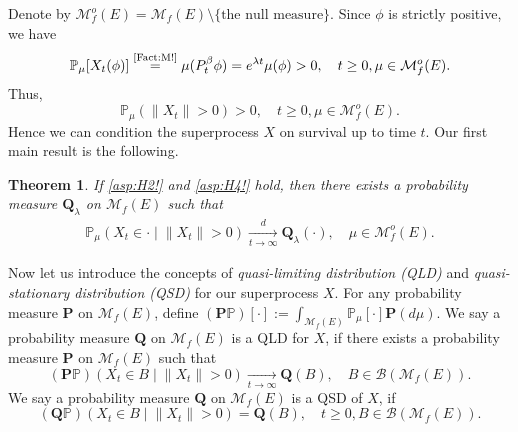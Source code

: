 \documentclass[12pt,a4paper]{amsart}
\numberwithin{equation}{section}
\theoremstyle{plain}
\newtheorem{thm}{Theorem}[section]
\theoremstyle{definition}
\theoremstyle{remark}
\begin{document}
	Denote by $\mathcal M_f^o(E) = \mathcal M_f(E)\setminus \{ \text{the null measure}\}$.
	Since $\phi$ is strictly positive, we have
\begin{equation}
	\mathbb P_\mu[X_t(\phi)]
	\overset{\text{\eqref{Fact:M!}}}= \mu(P_t^\beta \phi)
	=e^{\lambda t}\mu(\phi)>0, \quad t\geq 0, \mu \in \mathcal M_f^o(E).
\end{equation}
	Thus,
\begin{equation}  \label{lem:Nd!}
		\mathbb P_\mu(\|X_t\| > 0) > 0,\quad t\geq 0,\mu \in \mathcal M_f^o(E).
\end{equation}
	Hence we can condition the superprocess $X$ on survival up to time $t$.
	Our first main result is the following.
	
\begin{thm} \label{Theorem:Y:H1:H2:H3:H4}
	If \eqref{asp:H2!} and \eqref{asp:H4!} hold,
	then there exists a probability measure $\mathbf Q_\lambda$ on $\mathcal M_f(E)$ such that
\begin{align}
 	\mathbb P_\mu \left(X_t \in \cdot \middle| \|X_t\| > 0 \right)
 	\xrightarrow[t\to \infty]{d} \mathbf Q_\lambda(\cdot),
 	\quad \mu \in \mathcal M_f^o(E).
\end{align}
\end{thm}

	Now let us introduce the concepts of \emph{quasi-limiting distribution (QLD)} and \emph{quasi-stationary distribution (QSD)} for our superprocess $X$.
	For any probability measure $\mathbf P$ on $\mathcal M_f(E)$, define $(\mathbf P\mathbb P)[\cdot] := \int_{\mathcal M_f(E)} \mathbb P_\mu[\cdot] \mathbf P(d\mu)$.
	We say a probability measure $\mathbf Q$ on $\mathcal M_f(E)$ is a QLD for $X$, if there exists a probability measure $\mathbf P$ on $\mathcal M_f(E)$ such that
	\[
	(\mathbf P\mathbb P)\left(X_t \in B \middle| \|X_t\|>0\right) \xrightarrow[t\to \infty]{} \mathbf Q(B), \quad B\in \mathcal B(\mathcal M_f(E)).
	\]
	We say a probability measure $\mathbf Q$ on $\mathcal M_f(E)$ is a QSD of $X$, if
	\[
	(\mathbf Q \mathbb P) \left( X_t \in B \middle | \|X_t\|>0 \right) = \mathbf Q(B), \quad t\geq 0, B \in \mathcal B(\mathcal M_f(E)).
	\]
	
\end{document}
